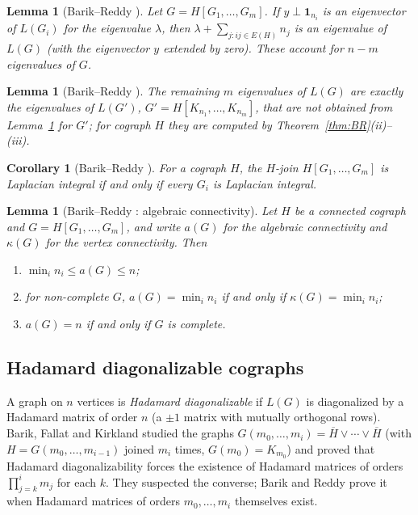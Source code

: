 \documentclass[11pt]{article}
\theoremstyle{plain}
\newtheorem{lemma}[theorem]{Lemma}
\newtheorem{corollary}[theorem]{Corollary}
\theoremstyle{definition}
\theoremstyle{remark}
\begin{document}
	\begin{lemma}[Barik--Reddy \cite{BarikReddy2023}]
		\label{lem:BRlemma12}
		Let $G=H[G_1,\dots,G_m]$. If $y\perp\mathbf 1_{n_i}$ is an eigenvector of $L(G_i)$ for the eigenvalue $\lambda$, then $\lambda+\sum_{j:ij\in E(H)}n_j$ is an eigenvalue of $L(G)$ (with the eigenvector $y$ extended by zero). These account for $n-m$ eigenvalues of $G$.
	\end{lemma}
	
	\begin{lemma}[Barik--Reddy \cite{BarikReddy2023}]
		\label{lem:BRlemma13}
		The remaining $m$ eigenvalues of $L(G)$ are exactly the eigenvalues of $L(G')$, $G'=H[K_{n_1},\dots,K_{n_m}]$, that are not obtained from Lemma~\ref{lem:BRlemma12} for $G'$; for cograph $H$ they are computed by Theorem~\ref{thm:BR}(ii)--(iii).
	\end{lemma}
	
	\begin{corollary}[Barik--Reddy \cite{BarikReddy2023}]
		\label{cor:BRintegral}
		For a cograph $H$, the $H$-join $H[G_1,\dots,G_m]$ is Laplacian integral if and only if every $G_i$ is Laplacian integral.
	\end{corollary}
	
	\begin{lemma}[Barik--Reddy \cite{BarikReddy2023}: algebraic connectivity]
		\label{lem:BRalgconn}
		Let $H$ be a connected cograph and $G=H[G_1,\dots,G_m]$, and write $a(G)$ for the algebraic connectivity and $\kappa(G)$ for the vertex connectivity. Then
		\begin{enumerate}
			\item[\rm(i)] $\min_i n_i\le a(G)\le n$;
			\item[\rm(ii)] for non-complete $G$, $a(G)=\min_i n_i$ if and only if $\kappa(G)=\min_i n_i$;
			\item[\rm(iii)] $a(G)=n$ if and only if $G$ is complete.
		\end{enumerate}
	\end{lemma}
	
	\subsection{Hadamard diagonalizable cographs}
	\label{sub:hadamard}
	
	A graph on $n$ vertices is \emph{Hadamard diagonalizable} if $L(G)$ is diagonalized by a Hadamard matrix of order $n$ (a $\pm1$ matrix with mutually orthogonal rows). Barik, Fallat and Kirkland \cite{BarikFallatKirkland2011} studied the graphs $G(m_0,\dots,m_i)=\overline{H}\vee\cdots\vee\overline{H}$ (with $H=G(m_0,\dots,m_{i-1})$ joined $m_i$ times, $G(m_0)=K_{m_0}$) and proved that Hadamard diagonalizability forces the existence of Hadamard matrices of orders $\prod_{j=k}^{i}m_j$ for each $k$. They suspected the converse; Barik and Reddy prove it when Hadamard matrices of orders $m_0,\dots,m_i$ themselves exist.
	
\end{document}
